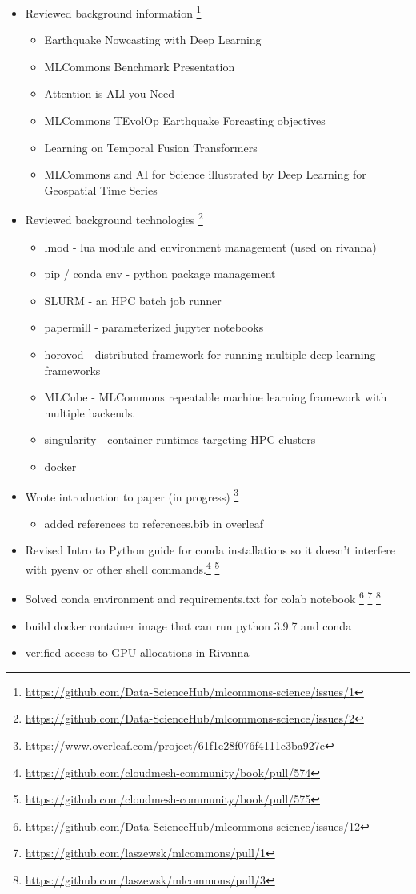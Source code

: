 \documentclass[sigplan,screen]{format/acmart}
\providecommand{\mlcube}{MLCube}
\begin{document}
{\begin{itemize}
\item Reviewed background information \footnote{\url{https://github.com/Data-ScienceHub/mlcommons-science/issues/1}}
    \begin{itemize}
    \item Earthquake Nowcasting with Deep Learning
    \item MLCommons Benchmark Presentation
    \item Attention is ALl you Need
    \item MLCommons TEvolOp Earthquake Forcasting objectives
    \item Learning on Temporal Fusion Transformers
    \item MLCommons and AI for Science illustrated by Deep Learning for Geospatial Time Series
    \end{itemize}
\item Reviewed background technologies \footnote{\url{https://github.com/Data-ScienceHub/mlcommons-science/issues/2}}
    \begin{itemize}
    \item lmod - lua module and environment management (used on rivanna)
    \item pip / conda env - python package management
    \item SLURM - an HPC batch job runner
    \item papermill - parameterized jupyter notebooks
    \item horovod - distributed framework for running multiple deep learning frameworks
    \item \mlcube{} - MLCommons repeatable machine learning framework with multiple backends.
    \item singularity - container runtimes targeting HPC clusters
    \item docker
\end{itemize}
\item Wrote introduction to paper (in progress) \footnote{\url{https://www.overleaf.com/project/61f1e28f076f4111c3ba927e}}
    \begin{itemize}
    \item added references to references.bib in overleaf
    \end{itemize}
\item Revised Intro to Python guide for conda installations so it doesn't interfere with pyenv or other shell commands.\footnote{\url{https://github.com/cloudmesh-community/book/pull/574}} \footnote{\url{https://github.com/cloudmesh-community/book/pull/575}}
\item Solved conda environment and requirements.txt for colab notebook
\footnote{\url{https://github.com/Data-ScienceHub/mlcommons-science/issues/12}} \footnote{\url{https://github.com/laszewsk/mlcommons/pull/1}} \footnote{\url{https://github.com/laszewsk/mlcommons/pull/3}}
\item build docker container image that can run python 3.9.7 and conda
\item verified access to GPU allocations in Rivanna
\end{itemize}

}
\end{document}
